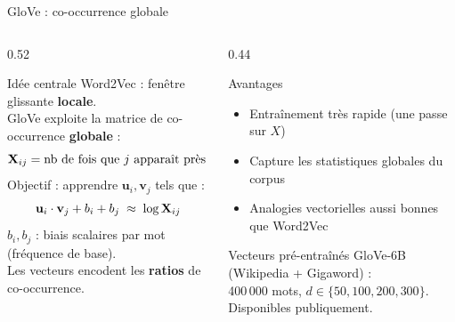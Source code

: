 \documentclass[aspectratio=169, 10pt]{beamer}
\begin{document}
\begin{frame}{GloVe : co-occurrence globale}
  \begin{columns}[T]
    \begin{column}{0.52\textwidth}
      \begin{block}{Idée centrale}
        Word2Vec : fenêtre glissante \textbf{locale}.\\[4pt]
        GloVe exploite la matrice de co-occurrence \textbf{globale} :
        \[
          \mathbf{X}_{ij} = \text{nb de fois que } j \text{ apparaît près de } i
        \]
        Objectif : apprendre $\mathbf{u}_i, \mathbf{v}_j$ tels que :
        \[
          \mathbf{u}_i \cdot \mathbf{v}_j + b_i + b_j \;\approx\; \log \mathbf{X}_{ij}
        \]
        $b_i, b_j$ : biais scalaires par mot (fréquence de base).\\
        Les vecteurs encodent les \textbf{ratios} de co-occurrence.
      \end{block}
    \end{column}
    \begin{column}{0.44\textwidth}
      \begin{exampleblock}{Avantages}
        \begin{itemize}
          \item Entraînement très rapide (une passe sur $X$)
          \item Capture les statistiques globales du corpus
          \item Analogies vectorielles aussi bonnes que Word2Vec
        \end{itemize}
      \end{exampleblock}
      \vspace{4pt}
      \begin{block}{Vecteurs pré-entraînés}
        GloVe-6B (Wikipedia + Gigaword) :\\
        400\,000 mots, $d \in \{50, 100, 200, 300\}$.\\
        Disponibles publiquement.
      \end{block}
    \end{column}
  \end{columns}
\end{frame}
\end{document}

